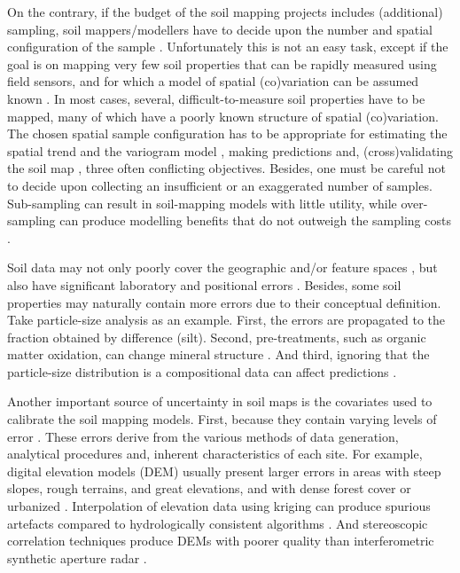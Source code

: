 On the contrary, if the budget of the soil mapping projects includes (additional) sampling, soil 
mappers/modellers have to decide upon the number and spatial configuration of the sample 
\citep{deGruijterEtAl2006, WebsterEtAl2013}. Unfortunately this is not an easy task, except if the 
goal is on mapping very few soil properties that can be rapidly measured using field sensors, and for 
which a model of spatial (co)variation can be assumed known \citep{MarchantEtAl2006}. In most cases,
several, difficult-to-measure soil properties have to be mapped, many of which have a poorly known 
structure of spatial (co)variation. The chosen spatial sample configuration has to be appropriate 
for estimating the spatial trend \citep{HenglEtAl2003a, MinasnyEtAl2006b} and the variogram model 
\citep{WarrickEtAl1987, WebsterEtAl1992, Lark2002}, making predictions 
\citep{YfantisEtAl1987, WalvoortEtAl2010} and, (cross)validating the soil map \citep{BrusEtAl2011}, 
three often conflicting objectives. Besides, one must be careful not to decide upon collecting an 
insufficient or an exaggerated number of samples. Sub-sampling can result in soil-mapping models 
with little utility, while over-sampling can produce modelling benefits that do not outweigh the
sampling costs \citep{vanGroenigenEtAl1999}.

Soil data may not only poorly cover the geographic and/or feature spaces \citep{HenglEtAl2003a}, but
also have significant laboratory and positional errors \citep{NelsonEtAl2011}. Besides, some soil 
properties may naturally contain more errors due to their conceptual definition. Take particle-size
analysis as an example. First, the errors are propagated to the fraction obtained by difference 
(silt). Second, pre-treatments, such as organic matter oxidation, can change mineral structure
\citep{MikuttaEtAl2005a}. And third, ignoring that the particle-size distribution is a compositional
data can affect predictions \citep{LarkEtAl2007}.

Another important source of uncertainty in soil maps is the covariates used to calibrate the soil
mapping models. First, because they contain varying levels of error \citep{HeuvelinkEtAl1989}.
These errors derive from the various methods of data generation, analytical procedures and, 
inherent characteristics of each site. For example, digital elevation models (DEM) usually present 
larger errors in areas with steep slopes, rough terrains, and great elevations, and with dense 
forest cover or urbanized \citep{Florinsky1998, Toutin2000, FisherEtAl2006}. Interpolation of 
elevation data using kriging can produce spurious artefacts \cite{HenglEtAl2009} compared to 
hydrologically consistent algorithms \citep{Hutchinson1989}. And stereoscopic correlation techniques
produce DEMs with poorer quality than interferometric synthetic aperture radar \cite{HirtEtAl2010}.




